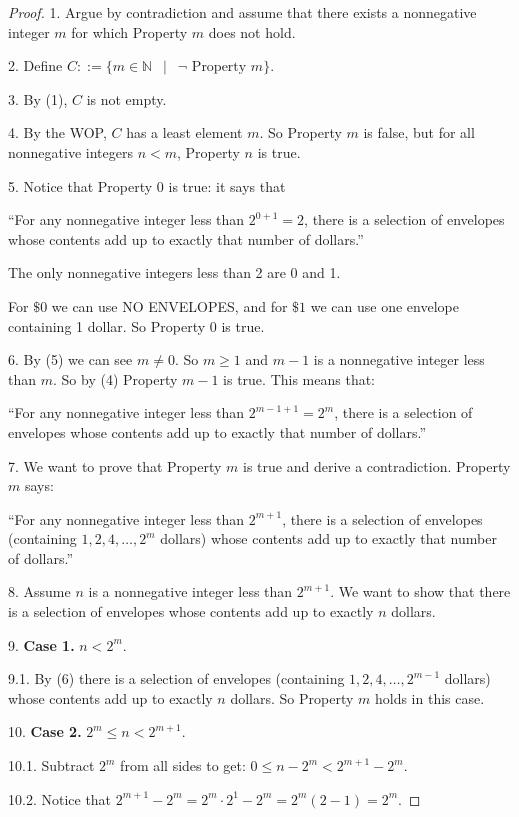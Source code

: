 \documentclass[14pt]{extarticle}
\begin{document}
\begin{proof}
1. Argue by contradiction and assume that there exists a nonnegative integer $m$ for which Property $m$ does not hold.

2. Define $C ::= \{m \in \mathbb{N} \,\,\,\mid\,\,\, \neg\text{ Property }m\}$.

3. By (1), $C$ is not empty.

4. By the WOP, $C$ has a least element $m$. So Property $m$ is false, but for all nonnegative integers $n < m$, Property $n$ is true.

5. Notice that Property $0$ is true: it says that 

``For any nonnegative integer less than $2^{0+1} = 2$, there is a selection of envelopes whose contents add up to exactly that number of dollars.'' 

The only nonnegative integers less than 2 are 0 and 1. 

For $\$0$ we can use NO ENVELOPES, and for $\$1$ we can use one envelope containing 1 dollar. So Property $0$ is true.

6. By (5) we can see $m \neq 0$. So $m \geq 1$ and $m - 1$ is a nonnegative integer less than $m$. So by (4) Property $m-1$ is true. This means that:
 
``For any nonnegative integer less than $2^{m-1+1} = 2^m$, there is a selection of envelopes whose contents add up to exactly that number of dollars.''

7. We want to prove that Property $m$ is true and derive a contradiction. Property $m$ says: 

``For any nonnegative integer less than $2^{m+1}$, there is a selection of envelopes (containing $1, 2, 4, \ldots, 2^m$ dollars) whose contents add up to exactly that number of dollars.'' 

8. Assume $n$ is a nonnegative integer less than $2^{m+1}$. We want to show that there is a selection of envelopes whose contents add up to exactly $n$ dollars.

9. \textbf{Case 1.} $n < 2^m$. 

9.1. By (6) there is a selection of envelopes (containing $1, 2, 4, \ldots, 2^{m-1}$ dollars) whose contents add up to exactly $n$ dollars. So Property $m$ holds in this case.

10. \textbf{Case 2.} $2^m \leq n < 2^{m+1}$. 

10.1. Subtract $2^m$ from all sides to get: $0 \leq n - 2^m < 2^{m+1} - 2^m$.

10.2. Notice that $2^{m+1} - 2^m = 2^m\cdot 2^1 - 2^m = 2^m(2-1) = 2^m$.


\end{proof}
\end{document}
